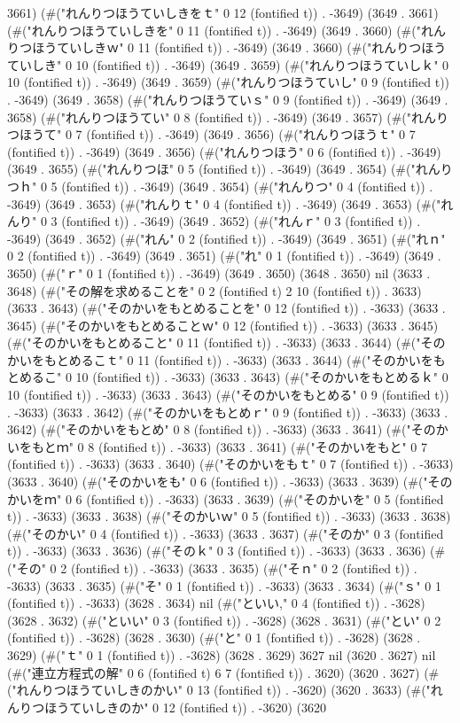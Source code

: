 3661) (#("れんりつほうていしきをｔ" 0 12 (fontified t)) . -3649) (3649 . 3661) (#("れんりつほうていしきを" 0 11 (fontified t)) . -3649) (3649 . 3660) (#("れんりつほうていしきｗ" 0 11 (fontified t)) . -3649) (3649 . 3660) (#("れんりつほうていしき" 0 10 (fontified t)) . -3649) (3649 . 3659) (#("れんりつほうていしｋ" 0 10 (fontified t)) . -3649) (3649 . 3659) (#("れんりつほうていし" 0 9 (fontified t)) . -3649) (3649 . 3658) (#("れんりつほうていｓ" 0 9 (fontified t)) . -3649) (3649 . 3658) (#("れんりつほうてい" 0 8 (fontified t)) . -3649) (3649 . 3657) (#("れんりつほうて" 0 7 (fontified t)) . -3649) (3649 . 3656) (#("れんりつほうｔ" 0 7 (fontified t)) . -3649) (3649 . 3656) (#("れんりつほう" 0 6 (fontified t)) . -3649) (3649 . 3655) (#("れんりつほ" 0 5 (fontified t)) . -3649) (3649 . 3654) (#("れんりつｈ" 0 5 (fontified t)) . -3649) (3649 . 3654) (#("れんりつ" 0 4 (fontified t)) . -3649) (3649 . 3653) (#("れんりｔ" 0 4 (fontified t)) . -3649) (3649 . 3653) (#("れんり" 0 3 (fontified t)) . -3649) (3649 . 3652) (#("れんｒ" 0 3 (fontified t)) . -3649) (3649 . 3652) (#("れん" 0 2 (fontified t)) . -3649) (3649 . 3651) (#("れｎ" 0 2 (fontified t)) . -3649) (3649 . 3651) (#("れ" 0 1 (fontified t)) . -3649) (3649 . 3650) (#("ｒ" 0 1 (fontified t)) . -3649) (3649 . 3650) (3648 . 3650) nil (3633 . 3648) (#("その解を求めることを" 0 2 (fontified t) 2 10 (fontified t)) . 3633) (3633 . 3643) (#("そのかいをもとめることを" 0 12 (fontified t)) . -3633) (3633 . 3645) (#("そのかいをもとめることｗ" 0 12 (fontified t)) . -3633) (3633 . 3645) (#("そのかいをもとめること" 0 11 (fontified t)) . -3633) (3633 . 3644) (#("そのかいをもとめるこｔ" 0 11 (fontified t)) . -3633) (3633 . 3644) (#("そのかいをもとめるこ" 0 10 (fontified t)) . -3633) (3633 . 3643) (#("そのかいをもとめるｋ" 0 10 (fontified t)) . -3633) (3633 . 3643) (#("そのかいをもとめる" 0 9 (fontified t)) . -3633) (3633 . 3642) (#("そのかいをもとめｒ" 0 9 (fontified t)) . -3633) (3633 . 3642) (#("そのかいをもとめ" 0 8 (fontified t)) . -3633) (3633 . 3641) (#("そのかいをもとｍ" 0 8 (fontified t)) . -3633) (3633 . 3641) (#("そのかいをもと" 0 7 (fontified t)) . -3633) (3633 . 3640) (#("そのかいをもｔ" 0 7 (fontified t)) . -3633) (3633 . 3640) (#("そのかいをも" 0 6 (fontified t)) . -3633) (3633 . 3639) (#("そのかいをｍ" 0 6 (fontified t)) . -3633) (3633 . 3639) (#("そのかいを" 0 5 (fontified t)) . -3633) (3633 . 3638) (#("そのかいｗ" 0 5 (fontified t)) . -3633) (3633 . 3638) (#("そのかい" 0 4 (fontified t)) . -3633) (3633 . 3637) (#("そのか" 0 3 (fontified t)) . -3633) (3633 . 3636) (#("そのｋ" 0 3 (fontified t)) . -3633) (3633 . 3636) (#("その" 0 2 (fontified t)) . -3633) (3633 . 3635) (#("そｎ" 0 2 (fontified t)) . -3633) (3633 . 3635) (#("そ" 0 1 (fontified t)) . -3633) (3633 . 3634) (#("ｓ" 0 1 (fontified t)) . -3633) (3628 . 3634) nil (#("といい," 0 4 (fontified t)) . -3628) (3628 . 3632) (#("といい" 0 3 (fontified t)) . -3628) (3628 . 3631) (#("とい" 0 2 (fontified t)) . -3628) (3628 . 3630) (#("と" 0 1 (fontified t)) . -3628) (3628 . 3629) (#("ｔ" 0 1 (fontified t)) . -3628) (3628 . 3629) 3627 nil (3620 . 3627) nil (#("連立方程式の解" 0 6 (fontified t) 6 7 (fontified t)) . 3620) (3620 . 3627) (#("れんりつほうていしきのかい" 0 13 (fontified t)) . -3620) (3620 . 3633) (#("れんりつほうていしきのか" 0 12 (fontified t)) . -3620) (3620 